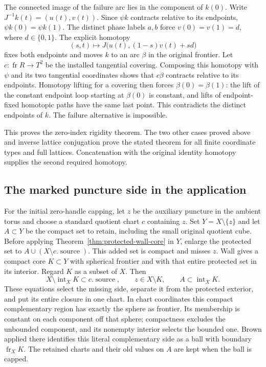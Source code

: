 The connected image of the failure arc lies in the component of $k(0)$.
Write $J^{-1}k(t)=(u(t),v(t))$. Since $\psi k$ contracts relative to
its endpoints, $\psi k(0)=\psi k(1)$. The distinct phase labels $a,b$
force $v(0)=v(1)=d$, where $d\in\{0,1\}$. The explicit homotopy
\[
 (s,t)\longmapsto J\bigl(u(t),(1-s)v(t)+sd\bigr)
\]
fixes both endpoints and moves $k$ to an arc $\beta$ in the original
frontier. Let $c:\operatorname{fr}R\to T^2$ be the installed tangential
covering. Composing this homotopy with $\psi$ and its two tangential
coordinates shows that $c\beta$ contracts relative to its endpoints.
Homotopy lifting for a covering then forces $\beta(0)=\beta(1)$:
the lift of the constant endpoint loop starting at $\beta(0)$ is
constant, and lifts of endpoint-fixed homotopic paths have the same
last point. This contradicts the distinct endpoints of $k$.
The failure alternative is impossible.

This proves the zero-index rigidity theorem. The two other cases
proved above and inverse lattice conjugation prove the stated theorem
for all finite coordinate types and full lattices. Concatenation with
the original identity homotopy supplies the second required homotopy.

\subsection{The marked puncture side in the application}

For the initial zero-handle capping, let $z$ be the auxiliary puncture
in the ambient torus and choose a standard quotient chart $c$ containing
$z$. Set $Y=X\setminus\{z\}$ and let $A\subset Y$ be the compact set to
retain, including the small original quotient cube. Before applying
Theorem~\ref{thm:protected-wall-core} in $Y$, enlarge the protected set
to $A\cup(X\setminus c.\operatorname{source})$. This added set is compact
and misses $z$. Wall gives a compact core $K\subset Y$ with spherical
frontier and with that entire protected set in its interior. Regard $K$
as a subset of $X$. Then
\[
 X\setminus\operatorname{int}_X K\subset c.\operatorname{source},
 \qquad z\in X\setminus K,\qquad A\subset\operatorname{int}_X K.
\]
These equations select the missing side, separate it from the protected
exterior, and put its entire closure in one chart. In chart coordinates
this compact complementary region has exactly the sphere as frontier.
Its membership is constant on each component off that sphere; compactness
excludes the unbounded component, and its nonempty interior selects the
bounded one. Brown applied there
identifies this literal complementary side as a ball with boundary
$\operatorname{fr}_X K$. The retained charts and their old values on
$A$ are kept when the ball is capped.

